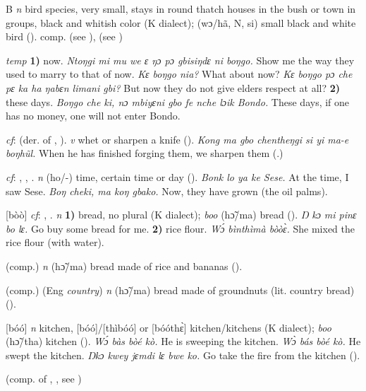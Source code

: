 \begin{letter}{B}
 \textit{n} bird species, very small, stays in round thatch houses in the bush or town in groups, black and whitish color (K dialect); (wɔ/hã, N, si) small black and white bird (\citealt{Pichl1967}). comp.  (see ),  (see ) 

 \textit{temp} \textbf{1)} now. \textit{Ntoŋgi mi mu we ɛ ŋɔ pɔ gbisiŋdɛ ni boŋgo.} Show me the way they used to marry to that of now. \textit{Kɛ boŋgo nia?} What about now? \textit{Kɛ boŋgo pɔ che pɛ ka ha ŋabɛn limani gbi?} But now they do not give elders respect at all? \textbf{2)} these days. \textit{Boŋgo che ki, nɔ mbiyɛni gbo fe nche lɔik Bondo.} These days, if one has no money, one will not enter Bondo.

 \textit{cf}:  (der. of , ). \textit{v} whet or sharpen a knife (\citealt{Pichl1967}). \textit{Kong ma gbo chentheŋgi si yi ma-e boŋhũl.} When he has finished forging them, we sharpen them (\citealt{Pichl1967}.) 

 \textit{cf}: , , . \textit{n} (ho/-) time, certain time or day (\citealt{Pichl1967}). \textit{Bonk lo ya ke Sese.} At the time, I saw Sese. \textit{Boŋ cheki, ma koŋ gbako.} Now, they have grown (the oil palms).

 [bòò] \textit{cf}: , . \textit{n} \textbf{1)} bread, no plural (K dialect); \textit{boo} (hɔ̃/ma) bread (\citealt{Pichl1967}). \textit{Ŋ kɔ mi pinɛ bo lɛ.} Go buy some bread for me. \textbf{2)} rice flour. \textit{Wɔ́ bìnthìmà bòòɛ̀.} She mixed the rice flour (with water).

 (comp.) \textit{n} (hɔ̃/ma) bread made of rice and bananas (\citealt{Pichl1967}). 

 (comp.) (Eng \textit{country}) \textit{n} (hɔ̃/ma) bread made of groundnuts (lit. country bread) (\citealt{Pichl1967}). 

 [bóó] \textit{n} kitchen, [bóó]/[thìbóó] or [bóóthɛ̀] kitchen/kitchens (K dialect); \textit{boo} (hɔ̃/tha) kitchen (\citealt{Pichl1967}). \textit{Wɔ́ bàs bòé kò.} He is sweeping the kitchen. \textit{Wɔ̀ bás bòé kò.} He swept the kitchen. \textit{Ŋkɔ kwey jɛmdi lɛ bwe ko.} Go take the fire from the kitchen (\citealt{Pichl1967}).

 (comp. of , , see ) 


\end{letter}
